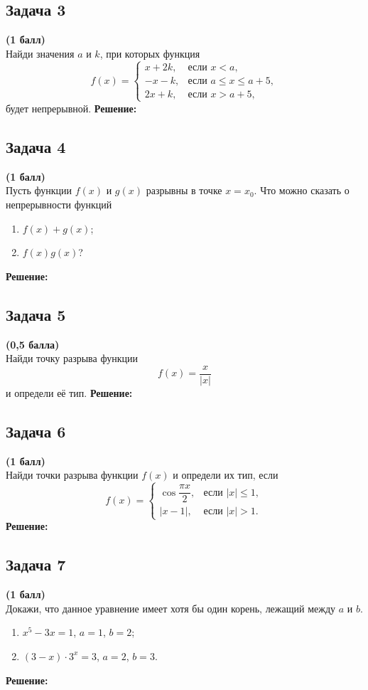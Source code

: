 \documentclass[a4paper,12pt]{article}
\begin{document}
\subsection{Задача 3}
\textbf{(1 балл)} \\
Найди значения $a$ и $k$, при которых функция
\[
f(x) =
\begin{cases}
    x + 2k, & \text{если } x < a, \\
    -x - k, & \text{если } a \leq x \leq a + 5, \\
    2x + k, & \text{если } x > a + 5,
\end{cases}
\]
будет непрерывной.
\textbf{Решение:}

\subsection{Задача 4}
\textbf{(1 балл)} \\
Пусть функции $f(x)$ и $g(x)$ разрывны в точке $x = x_0$. Что можно сказать о непрерывности функций
\begin{enumerate}[label=\alph*)]
    \item $f(x) + g(x)$;
    \item $f(x)g(x)$?
\end{enumerate}
\textbf{Решение:}

\subsection{Задача 5}
\textbf{(0,5 балла)} \\
Найди точку разрыва функции
\[
f(x) = \dfrac{x}{|x|}
\]
и определи её тип.
\textbf{Решение:}

\subsection{Задача 6}
\textbf{(1 балл)} \\
Найди точки разрыва функции $f(x)$ и определи их тип, если
\[
f(x) =
\begin{cases}
    \cos \dfrac{\pi x}{2}, & \text{если } |x| \leq 1, \\
    |x - 1|, & \text{если } |x| > 1.
\end{cases}
\]
\textbf{Решение:}

\subsection{Задача 7}
\textbf{(1 балл)} \\
Докажи, что данное уравнение имеет хотя бы один корень, лежащий между $a$ и $b$.
\begin{enumerate}[label=\alph*)]
    \item $x^5 - 3x = 1$, $a = 1$, $b = 2$;
    \item $(3 - x) \cdot 3^x = 3$, $a = 2$, $b = 3$.
\end{enumerate}
\textbf{Решение:}
\end{document}
